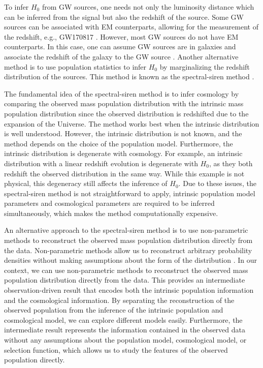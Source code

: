 \documentclass[sn-aps, pdflatex]{sn-jnl}
\begin{document}
To infer $H_0$ from \ac{GW} sources, one needs not only the luminosity distance which can be inferred from the signal but also the redshift of the source.
Some \ac{GW} sources can be associated with \ac{EM} counterparts, allowing for the measurement of the redshift, e.g., GW170817 \citep{LIGOScientific:2017adf, Guidorzi:2017ogy}.
However, most \ac{GW} sources do not have \ac{EM} counterparts.
In this case, one can assume \ac{GW} sources are in galaxies and associate the redshift of the galaxy to the \ac{GW} source \citep{Schutz:1986gp, DelPozzo:2011vcw, Gray:2019ksv, Gray:2023wgj}.
Another alternative method is to use population statistics to infer $H_0$ by marginalizing the redshift distribution of the sources.
This method is known as the spectral-siren method \citep{You:2020wju, Mastrogiovanni:2021wsd, LIGOScientific:2021aug, Ezquiaga:2022zkx}.

The fundamental idea of the spectral-siren method is to infer cosmology by comparing the observed mass population distribution with the intrinsic mass population distribution since the observed distribution is redshifted due to the expansion of the Universe.
The method works best when the intrinsic distribution is well understood.
However, the intrinsic distribution is not known, and the method depends on the choice of the population model.
Furthermore, the intrinsic distribution is degenerate with cosmology.
For example, an intrinsic distribution with a linear redshift evolution is degenerate with $H_0$, as they both redshift the observed distribution in the same way.
While this example is not physical, this degeneracy still affects the inference of $H_0$.
Due to these issues, the spectral-siren method is not straightforward to apply, intrinsic population model parameters and cosmological parameters are required to be inferred simultaneously, which makes the method computationally expensive.

An alternative approach to the spectral-siren method is to use non-parametric methods to reconstruct the observed mass population distribution directly from the data.
Non-parametric methods allow us to reconstruct arbitrary probability densities without making assumptions about the form of the distribution \citep{Rinaldi:2021bhm}.
In our context, we can use non-parametric methods to reconstruct the observed mass population distribution directly from the data.
This provides an intermediate observation-driven result that encodes both the intrinsic population information and the cosmological information.
By separating the reconstruction of the observed population from the inference of the intrinsic population and cosmological model, we can explore different models easily.
Furthermore, the intermediate result represents the information contained in the observed data without any assumptions about the population model, cosmological model, or selection function, which allows us to study the features of the observed population directly.
\end{document}
